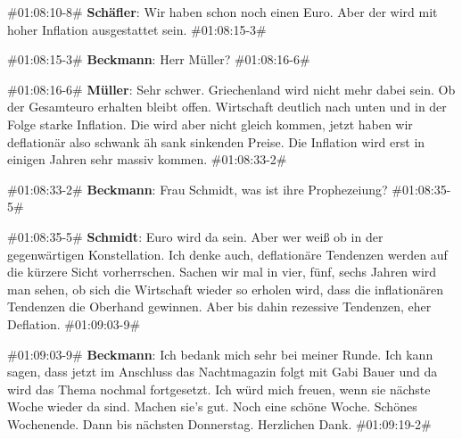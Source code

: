 {\begin{description}
\begin{linenumbers}
		\item \#01:08:10-8\# \textbf{Schäfler}: Wir haben schon noch einen Euro. Aber der wird mit hoher Inflation ausgestattet sein. \#01:08:15-3\# 
		
		\item \#01:08:15-3\# \textbf{Beckmann}: Herr Müller? \#01:08:16-6\# 
		
		\item \#01:08:16-6\# \textbf{Müller}: Sehr schwer. Griechenland wird nicht mehr dabei sein. Ob der Gesamteuro erhalten bleibt offen. Wirtschaft deutlich nach unten und in der Folge starke Inflation. Die wird aber nicht gleich kommen, jetzt haben wir deflationär also schwank äh sank sinkenden Preise. Die Inflation wird erst in einigen Jahren sehr massiv kommen.  \#01:08:33-2\# 
		
		\item \#01:08:33-2\# \textbf{Beckmann}: Frau Schmidt, was ist ihre Prophezeiung? \#01:08:35-5\# 
		
		\item \#01:08:35-5\# \textbf{Schmidt}: Euro wird da sein. Aber wer weiß ob in der gegenwärtigen Konstellation. Ich denke auch, deflationäre Tendenzen werden auf die kürzere Sicht vorherrschen. Sachen wir mal in vier, fünf, sechs Jahren wird man sehen, ob sich die Wirtschaft wieder so erholen wird, dass die inflationären Tendenzen die Oberhand gewinnen. Aber bis dahin rezessive Tendenzen, eher Deflation. \#01:09:03-9\# 
		
		\item \#01:09:03-9\# \textbf{Beckmann}: Ich bedank mich sehr bei meiner Runde. Ich kann sagen, dass jetzt im Anschluss das Nachtmagazin folgt mit Gabi Bauer und da wird das Thema nochmal fortgesetzt. Ich würd mich freuen, wenn sie nächste Woche wieder da sind. Machen sie's gut. Noch eine schöne Woche. Schönes Wochenende. Dann bis nächsten Donnerstag. Herzlichen Dank. \#01:09:19-2\#
	\end{linenumbers}
	\label{lis:36}
\end{description}

}
